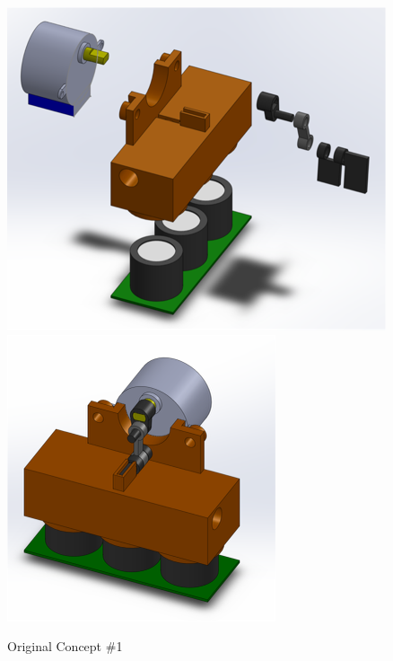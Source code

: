 \begin{figure}[htb]
 	\includegraphics[width=\textwidth/2]{visuals/prevwork1a}    
 	\includegraphics[width=\textwidth/2]{visuals/prevwork1b}            
 	 \caption{Original Concept \#1}
  	\label{fig:prevwork1a}
\end{figure}


